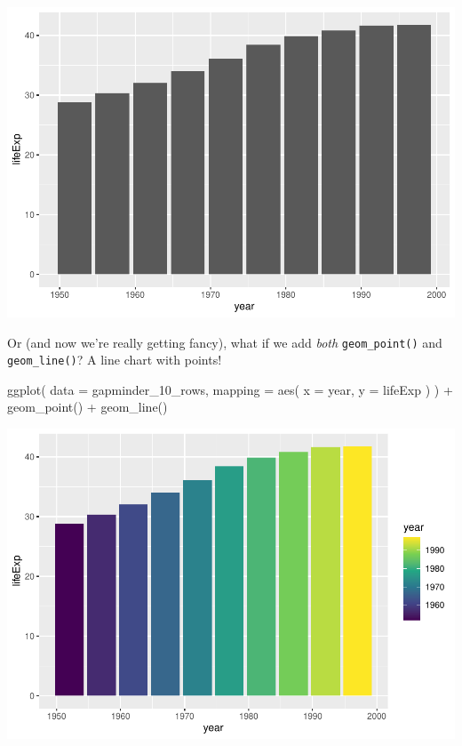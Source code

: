 \documentclass[
]{book}
\newenvironment{Shaded}{\begin{snugshade}}{\end{snugshade}}
\newcommand{\AttributeTok}[1]{\textcolor[rgb]{0.77,0.63,0.00}{#1}}
\newcommand{\FunctionTok}[1]{\textcolor[rgb]{0.00,0.00,0.00}{#1}}
\newcommand{\NormalTok}[1]{#1}
\newcommand{\SpecialCharTok}[1]{\textcolor[rgb]{0.00,0.00,0.00}{#1}}
\begin{document}
\includegraphics[width=1\linewidth]{data-viz_files/figure-latex/unnamed-chunk-14-1}

Or (and now we're really getting fancy), what if we add \emph{both} \texttt{geom\_point()} and \texttt{geom\_line()}? A line chart with points!

\begin{Shaded}
\begin{Highlighting}[]
\FunctionTok{ggplot}\NormalTok{(}
  \AttributeTok{data =}\NormalTok{ gapminder\_10\_rows,}
  \AttributeTok{mapping =} \FunctionTok{aes}\NormalTok{(}
    \AttributeTok{x =}\NormalTok{ year,}
    \AttributeTok{y =}\NormalTok{ lifeExp}
\NormalTok{  )}
\NormalTok{) }\SpecialCharTok{+}
  \FunctionTok{geom\_point}\NormalTok{() }\SpecialCharTok{+}
  \FunctionTok{geom\_line}\NormalTok{()}
\end{Highlighting}
\end{Shaded}

\includegraphics[width=1\linewidth]{data-viz_files/figure-latex/unnamed-chunk-16-1}
\end{document}
